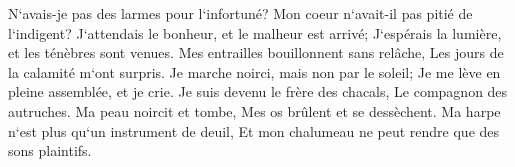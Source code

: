 \verse N`avais-je pas des larmes pour l`infortuné? Mon coeur n`avait-il pas pitié de l`indigent? 
\verse J`attendais le bonheur, et le malheur est arrivé; J`espérais la lumière, et les ténèbres sont venues. 
\verse Mes entrailles bouillonnent sans relâche, Les jours de la calamité m`ont surpris. 
\verse Je marche noirci, mais non par le soleil; Je me lève en pleine assemblée, et je crie. 
\verse Je suis devenu le frère des chacals, Le compagnon des autruches. 
\verse Ma peau noircit et tombe, Mes os brûlent et se dessèchent. 
\verse Ma harpe n`est plus qu`un instrument de deuil, Et mon chalumeau ne peut rendre que des sons plaintifs. 

\chapter{}

